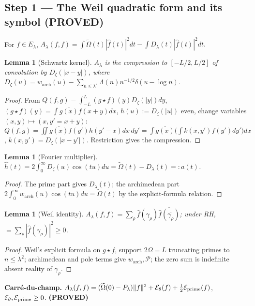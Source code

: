 \documentclass[11pt]{article}
\newtheorem{lemma}[theorem]{Lemma}
\theoremstyle{remark}
\newcommand{\Om}{\widetilde{\Omega}}
\newcommand{\PROVED}{\textbf{(PROVED)}}
\begin{document}
\subsection{Step 1 --- The Weil quadratic form and its symbol \PROVED}
For $f\in E_\lambda$,
$A_\lambda(f,f)=\int\Om(t)|\hat f(t)|^2dt-\int D_\lambda(t)|\hat f(t)|^2dt.$
\begin{lemma}[Schwartz kernel]
$A_\lambda$ is the compression to $[-L/2,L/2]$ of convolution by $D_\zeta(|x-y|)$, where
$D_\zeta(u)=w_{\mathrm{arch}}(u)-\sum_{n\le\lambda^2}\Lambda(n)n^{-1/2}\delta(u-\log n)$.
\end{lemma}
\begin{proof}
From $Q(f,g)=\int_{-L}^{L}(g\star f)(y)D_\zeta(|y|)dy$, $(g\star f)(y)=\int\overline{g(x)}f(x+y)dx$,
$h(u):=D_\zeta(|u|)$ even, change variables $(x,y)\mapsto(x,y'{=}x{+}y)$:
$Q(f,g)=\iint\overline{g(x)}f(y')h(y'-x)dx\,dy'=\int\overline{g(x)}\big(\int k(x,y')f(y')dy'\big)dx$,
$k(x,y')=D_\zeta(|x-y'|)$. Restriction gives the compression.
\end{proof}
\begin{lemma}[Fourier multiplier]
$\hat h(t)=2\int_0^\infty D_\zeta(u)\cos(tu)du=\Om(t)-D_\lambda(t)=:a(t)$.
\end{lemma}
\begin{proof}
The prime part gives $D_\lambda(t)$; the archimedean part
$2\int_0^\infty w_{\mathrm{arch}}(u)\cos(tu)du=\Om(t)$ by the explicit-formula relation.
\end{proof}
\begin{lemma}[Weil identity]\label{weil}
$A_\lambda(f,f)=\sum_\rho\hat f(\gamma_\rho)\overline{\hat f(\overline{\gamma_\rho})}$; under RH,
$=\sum_\rho|\hat f(\gamma_\rho)|^2\ge0$.
\end{lemma}
\begin{proof}
Weil's explicit formula on $g\star f$, support $2\Omega=L$ truncating primes to $n\le\lambda^2$;
archimedean and pole terms give $w_{\mathrm{arch}},\mathcal P$; the zero sum is indefinite absent
reality of $\gamma_\rho$.
\end{proof}
\noindent\textbf{Carr\'e-du-champ.}
$A_\lambda(f,f)=(\Om(0)-P_\lambda)\|f\|^2+\mathcal E_\theta(f)+\tfrac12\mathcal E_{\rm prime}(f)$,
$\mathcal E_\theta,\mathcal E_{\rm prime}\ge0$. \PROVED
\end{document}
